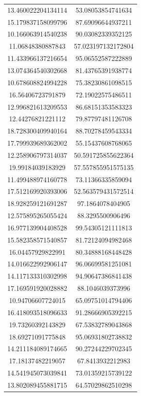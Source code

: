 \begin{table}
\begin{tabular}{cc}
13.460022204134114 & 53.08053854741634 \\
15.179837158099796 & 87.69096644937211 \\
10.166063914540238 & 90.03082339352125 \\
11.06848380887843 & 57.023197132172804 \\
11.433966137216654 & 95.06552587222889 \\
13.074364540302668 & 81.43765391938774 \\
10.678608824994228 & 75.38230861098515 \\
16.56406723791879 & 72.19022575486511 \\
12.996821613209553 & 86.68151353583323 \\
12.44276821221112 & 79.87797481126708 \\
18.728300409940164 & 88.70278459543334 \\
17.799939689362002 & 55.15437608768065 \\
12.258906797314037 & 50.591725855622364 \\
19.99184039183929 & 57.557855951575135 \\
11.499488974160778 & 73.11366335859094 \\
17.512169920393006 & 52.563579431572514 \\
18.928259121691287 & 97.1864078404905 \\
12.575895265055424 & 88.3295500906496 \\
16.977139904408528 & 99.54305121111813 \\
15.582358571540857 & 81.72124094982468 \\
16.04457929822991 & 80.34888168448428 \\
14.016622992906147 & 96.06699581251081 \\
14.117133310302998 & 94.90647386841438 \\
17.169591920028882 & 88.1046039373996 \\
10.94706607724015 & 65.09751014794406 \\
16.418093518096633 & 91.28666905392215 \\
19.73260392143829 & 67.53832789043868 \\
18.69271091775848 & 95.06931802738832 \\
14.211184089174665 & 90.27244229702345 \\
17.18137482219057 & 67.8413932212983 \\
14.541945073039841 & 73.01359215739122 \\
13.802089455881715 & 64.57029862510298 \\

\end{tabular}
\end{table}
